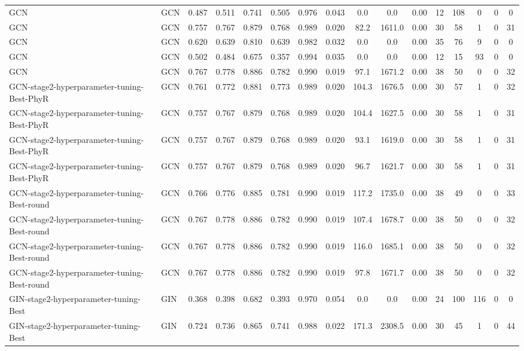\begin{table*}[p]
{\begin{tabular}{llcccccccccccccc}
      GCN & GCN & 0.487 & 0.511 & 0.741 & 0.505 & 0.976 & 0.043 & 0.0 & 0.0 & 0.00 & 12 & 108 & 0 & 0 & 0 \\
      GCN & GCN & 0.757 & 0.767 & 0.879 & 0.768 & 0.989 & 0.020 & 82.2 & 1611.0 & 0.00 & 30 & 58 & 1 & 0 & 31 \\
      GCN & GCN & 0.620 & 0.639 & 0.810 & 0.639 & 0.982 & 0.032 & 0.0 & 0.0 & 0.00 & 35 & 76 & 9 & 0 & 0 \\
      GCN & GCN & 0.502 & 0.484 & 0.675 & 0.357 & 0.994 & 0.035 & 0.0 & 0.0 & 0.00 & 12 & 15 & 93 & 0 & 0 \\
      GCN & GCN & 0.767 & 0.778 & 0.886 & 0.782 & 0.990 & 0.019 & 97.1 & 1671.2 & 0.00 & 38 & 50 & 0 & 0 & 32 \\
      GCN-stage2-hyperparameter-tuning-Best-PhyR & GCN & 0.761 & 0.772 & 0.881 & 0.773 & 0.989 & 0.020 & 104.3 & 1676.5 & 0.00 & 30 & 57 & 1 & 0 & 32 \\
      GCN-stage2-hyperparameter-tuning-Best-PhyR & GCN & 0.757 & 0.767 & 0.879 & 0.768 & 0.989 & 0.020 & 104.4 & 1627.5 & 0.00 & 30 & 58 & 1 & 0 & 31 \\
      GCN-stage2-hyperparameter-tuning-Best-PhyR & GCN & 0.757 & 0.767 & 0.879 & 0.768 & 0.989 & 0.020 & 93.1 & 1619.0 & 0.00 & 30 & 58 & 1 & 0 & 31 \\
      GCN-stage2-hyperparameter-tuning-Best-PhyR & GCN & 0.757 & 0.767 & 0.879 & 0.768 & 0.989 & 0.020 & 96.7 & 1621.7 & 0.00 & 30 & 58 & 1 & 0 & 31 \\
      GCN-stage2-hyperparameter-tuning-Best-round & GCN & 0.766 & 0.776 & 0.885 & 0.781 & 0.990 & 0.019 & 117.2 & 1735.0 & 0.00 & 38 & 49 & 0 & 0 & 33 \\
      GCN-stage2-hyperparameter-tuning-Best-round & GCN & 0.767 & 0.778 & 0.886 & 0.782 & 0.990 & 0.019 & 107.4 & 1678.7 & 0.00 & 38 & 50 & 0 & 0 & 32 \\
      GCN-stage2-hyperparameter-tuning-Best-round & GCN & 0.767 & 0.778 & 0.886 & 0.782 & 0.990 & 0.019 & 116.0 & 1685.1 & 0.00 & 38 & 50 & 0 & 0 & 32 \\
      GCN-stage2-hyperparameter-tuning-Best-round & GCN & 0.767 & 0.778 & 0.886 & 0.782 & 0.990 & 0.019 & 97.8 & 1671.7 & 0.00 & 38 & 50 & 0 & 0 & 32 \\
      GIN-stage2-hyperparameter-tuning-Best & GIN & 0.368 & 0.398 & 0.682 & 0.393 & 0.970 & 0.054 & 0.0 & 0.0 & 0.00 & 24 & 100 & 116 & 0 & 0 \\
      GIN-stage2-hyperparameter-tuning-Best & GIN & 0.724 & 0.736 & 0.865 & 0.741 & 0.988 & 0.022 & 171.3 & 2308.5 & 0.00 & 30 & 45 & 1 & 0 & 44 \\

\end{tabular}}
\end{table*}
